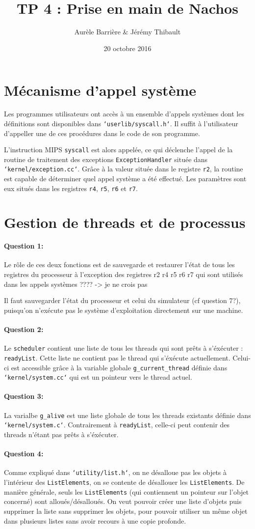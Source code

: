 \documentclass[11pt]{article}
\title{TP 4 : Prise en main de Nachos}
\author{Aurèle Barrière \& Jérémy Thibault}
\date{20 octobre 2016}
\def\question#1{\paragraph{Question #1:}}
\def\pathfile#1{\texttt{`#1`}}
\def\var#1{\texttt{#1}}
\def\func#1{\texttt{#1}}
\def\obj#1{\texttt{#1}}
\def\comment#1{\color{red}#1\color{black}}
\begin{document}
\maketitle

\section*{Mécanisme d'appel système}

Les programmes utilisateurs ont accès à un ensemble d'appels systèmes dont les définitions sont disponibles dans \pathfile{userlib/syscall.h}. Il suffit à l'utilisateur d'appeller une de ces procédures dans le code de son programme.

L'instruction MIPS \func{syscall} est alors appelée, ce qui déclenche l'appel de la routine de traitement des exceptions \func{ExceptionHandler} située dans \pathfile{kernel/exception.cc}. Grâce à la valeur située dans le registre \var{r2}, la routine est capable de déterminer quel appel système a été effectué. Les paramètres sont eux situés dans les registres \var{r4}, \var{r5}, \var{r6} et \var{r7}.


\section*{Gestion de threads et de processus}
\question{1} Le rôle de ces deux fonctions est de sauvegarde et restaurer l'état de tous les registres du processeur \comment{à l'exception des registres r2 r4 r5 r6 r7 qui sont utilisés dans les appels systèmes ???? -> je ne crois pas}

Il faut sauvegarder l'état du processeur et celui du simulateur \comment{(cf question 7?)}, puisqu'on n'exécute pas le système d'exploitation directement sur une machine.

\question{2} Le \obj{scheduler} contient une liste de tous les threads qui sont prêts à s'éxécuter : \var{readyList}. Cette liste ne contient pas le thread qui s'éxécute actuellement. Celui-ci est accessible grâce à la variable globale \var{g\_current\_thread} définie dans \pathfile{kernel/system.cc} qui est un pointeur vers le thread actuel.

\question{3} La varialbe \var{g\_alive} est une liste globale de tous les threads existants définie dans \pathfile{kernel/system.c}. Contrairement à \var{readyList}, celle-ci peut contenir des threads n'étant pas prêts à s'éxécuter.

\question{4} 
Comme expliqué dans \pathfile{utility/list.h}, on ne désalloue pas les objets à l'intérieur des \obj{ListElements}, on se contente de désallouer les \obj{ListElements}. De manière générale, seuls les \obj{ListElements} (qui contiennent un pointeur sur l'objet concerné) sont alloués/désalloués. On veut pouvoir créer une liste d'objets puis supprimer la liste sans supprimer les objets, pour pouvoir utiliser un même objet dans plusieurs listes sans avoir recours à une copie profonde.
\end{document}
